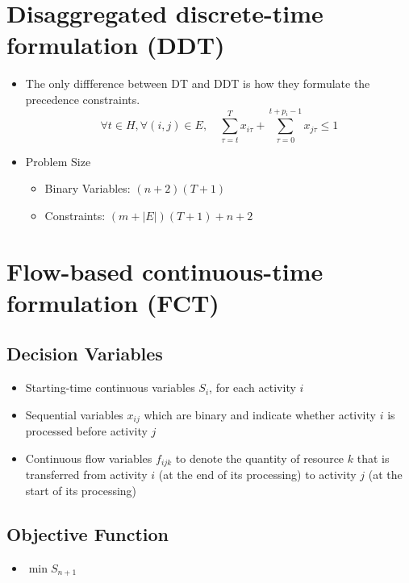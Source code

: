 \documentclass{paper}
\begin{document}
	\section{Disaggregated discrete-time formulation (DDT)}
	  \begin{itemize}
		\item The only diffference between DT and DDT is how they formulate the precedence constraints.
		\begin{equation}
			\forall t \in H, \forall (i,j) \in E, \quad \sum_{\tau =t}^{T} x_{i\tau}+\sum_{\tau =0}^{t+p_i-1} x_{j\tau}\leq 1
		\end{equation}
	  \end{itemize}
	  \begin{itemize}
		\item Problem Size
		\begin{itemize}
		  \item Binary Variables: $(n+2)(T+1)$ 
		  \item Constraints: $(m+\left\lvert E \right\rvert)(T+1)+n+2$ 
		\end{itemize}
	  \end{itemize}

	\section{Flow-based continuous-time formulation (FCT)}
	\subsection{Decision Variables}
	\begin{itemize}
	\item Starting-time continuous variables $S_i$, for each activity $i$
	\item Sequential variables $x_{ij}$ which are binary and indicate whether activity $i$ is processed before activity $j$
	\item Continuous flow variables $f_{ijk}$ to denote the quantity of resource $k$ that is transferred 
	from activity $i$ (at the end of its processing) to activity $j$ (at the start of its processing)
	\end{itemize}
	\subsection{Objective Function}
	\begin{itemize}
	  \item $\min S_{n+1}$
	\end{itemize}
\end{document}
